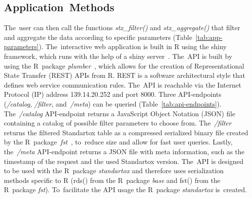 \documentclass[data,datadescriptor,accept,moreauthors,pdftex]{Definitions/mdpi}
\begin{document}
\subsection{Application~Methods}
 The~user can then call the functions \textit{stx\_filter()} and \textit{stx\_aggregate()} that filter and aggregate the data according to specific parameters (Table~\ref{tab:app-parameters}). The~interactive web application is built in R using the shiny framework, which runs with the help of a shiny {server}~\citep{R-shiny}. The~API is built by using the R~package {\textit{plumber}}~\citep{R-plumber}, which allows for the creation of Representational State Transfer (REST) APIs from R. REST is a software architectural style that defines web service communication rules. The~API is reachable via the Internet Protocol (IP) address 139.14.20.252 and port 8000. Three API-endpoints (\textit{/catalog}, \textit{/filter}, and~\textit{/meta}) can be queried (Table~\ref{tab:api-endpoints}). The~\textit{/catalog} API-endpoint returns a JavaScript Object Notation (JSON) file containing a catalog of possible filter parameters to choose from. The~\textit{/filter} returns the filtered Standartox table as a compressed serialized binary file created by the R~{package}~\textit{fst}~\citep{R-fst}, to~reduce size and allow for fast user queries. Lastly, the~\textit{/meta} API-endpoint returns a JSON file with meta information, such as the timestamp of the request and the used Standartox version. The~API is designed to be used with the R~package \textit{standartox} and therefore uses serialization methods specific to R (rds() from the R~package \textit{base} and fst() from the R~package \textit{fst}). To~facilitate the API usage the R~package \textit{standartox} is~created.%
\end{document}
